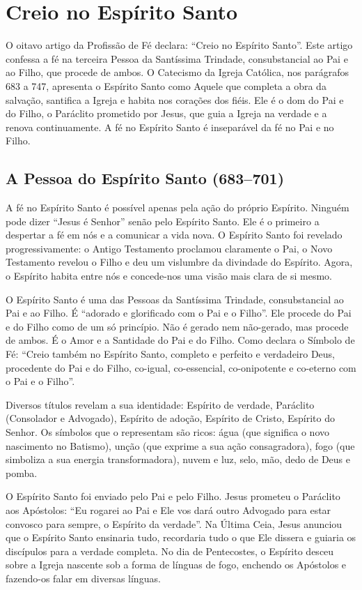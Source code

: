 \chapter{Creio no Espírito Santo}

O oitavo artigo da Profissão de Fé declara: ``Creio no Espírito Santo''. Este artigo confessa a fé na terceira Pessoa da Santíssima Trindade, consubstancial ao Pai e ao Filho, que procede de ambos. O Catecismo da Igreja Católica, nos parágrafos 683 a 747, apresenta o Espírito Santo como Aquele que completa a obra da salvação, santifica a Igreja e habita nos corações dos fiéis. Ele é o dom do Pai e do Filho, o Paráclito prometido por Jesus, que guia a Igreja na verdade e a renova continuamente. A fé no Espírito Santo é inseparável da fé no Pai e no Filho.

\section{A Pessoa do Espírito Santo (683--701)}

A fé no Espírito Santo é possível apenas pela ação do próprio Espírito. Ninguém pode dizer ``Jesus é Senhor'' senão pelo Espírito Santo. Ele é o primeiro a despertar a fé em nós e a comunicar a vida nova. O Espírito Santo foi revelado progressivamente: o Antigo Testamento proclamou claramente o Pai, o Novo Testamento revelou o Filho e deu um vislumbre da divindade do Espírito. Agora, o Espírito habita entre nós e concede-nos uma visão mais clara de si mesmo.

O Espírito Santo é uma das Pessoas da Santíssima Trindade, consubstancial ao Pai e ao Filho. É ``adorado e glorificado com o Pai e o Filho''. Ele procede do Pai e do Filho como de um só princípio. Não é gerado nem não-gerado, mas procede de ambos. É o Amor e a Santidade do Pai e do Filho. Como declara o Símbolo de Fé: ``Creio também no Espírito Santo, completo e perfeito e verdadeiro Deus, procedente do Pai e do Filho, co-igual, co-essencial, co-onipotente e co-eterno com o Pai e o Filho''.

Diversos títulos revelam a sua identidade: Espírito de verdade, Paráclito (Consolador e Advogado), Espírito de adoção, Espírito de Cristo, Espírito do Senhor. Os símbolos que o representam são ricos: água (que significa o novo nascimento no Batismo), unção (que exprime a sua ação consagradora), fogo (que simboliza a sua energia transformadora), nuvem e luz, selo, mão, dedo de Deus e pomba.

O Espírito Santo foi enviado pelo Pai e pelo Filho. Jesus prometeu o Paráclito aos Apóstolos: ``Eu rogarei ao Pai e Ele vos dará outro Advogado para estar convosco para sempre, o Espírito da verdade''. Na Última Ceia, Jesus anunciou que o Espírito Santo ensinaria tudo, recordaria tudo o que Ele dissera e guiaria os discípulos para a verdade completa. No dia de Pentecostes, o Espírito desceu sobre a Igreja nascente sob a forma de línguas de fogo, enchendo os Apóstolos e fazendo-os falar em diversas línguas.

